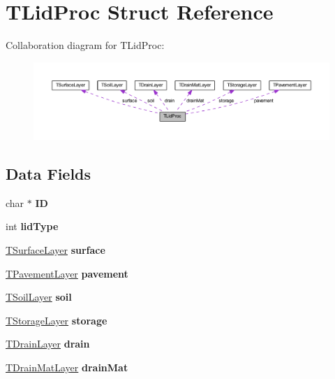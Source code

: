 \hypertarget{struct_t_lid_proc}{}\section{T\+Lid\+Proc Struct Reference}
\label{struct_t_lid_proc}


Collaboration diagram for T\+Lid\+Proc\+:
\nopagebreak
\begin{figure}[H]
\begin{center}
\leavevmode
\includegraphics[width=350pt]{d6/dd7/struct_t_lid_proc__coll__graph}
\end{center}
\end{figure}
\subsection*{Data Fields}
\begin{DoxyCompactItemize}
\item 
\mbox{\label{struct_t_lid_proc_a63756a4a33a8c806e584babb52907653}} 
char $\ast$ {\bfseries ID}
\item 
\mbox{\label{struct_t_lid_proc_a76fde42f250605c5bbc045f3b27268f9}} 
int {\bfseries lid\+Type}
\item 
\mbox{\label{struct_t_lid_proc_aee0fe847de93ca4ba21f96500a4209d6}} 
\hyperlink{struct_t_surface_layer}{T\+Surface\+Layer} {\bfseries surface}
\item 
\mbox{\label{struct_t_lid_proc_a1454c8bbca49161ce34952a7e5fb133b}} 
\hyperlink{struct_t_pavement_layer}{T\+Pavement\+Layer} {\bfseries pavement}
\item 
\mbox{\label{struct_t_lid_proc_a57055c3dc0c2796f30c6aba0bbf07679}} 
\hyperlink{struct_t_soil_layer}{T\+Soil\+Layer} {\bfseries soil}
\item 
\mbox{\label{struct_t_lid_proc_a2d8f2b13a4d6bf6323c86529aef7780e}} 
\hyperlink{struct_t_storage_layer}{T\+Storage\+Layer} {\bfseries storage}
\item 
\mbox{\label{struct_t_lid_proc_a51bfec792e7944411b8f4680c94d17bb}} 
\hyperlink{struct_t_drain_layer}{T\+Drain\+Layer} {\bfseries drain}
\item 
\mbox{\label{struct_t_lid_proc_a3e440b8255961e2e955234cc6380bd14}} 
\hyperlink{struct_t_drain_mat_layer}{T\+Drain\+Mat\+Layer} {\bfseries drain\+Mat}
\end{DoxyCompactItemize}


